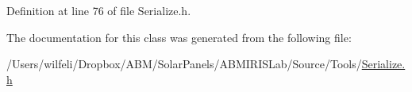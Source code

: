 Definition at line 76 of file Serialize.\+h.



The documentation for this class was generated from the following file\+:\begin{DoxyCompactItemize}
\item 
/\+Users/wilfeli/\+Dropbox/\+A\+B\+M/\+Solar\+Panels/\+A\+B\+M\+I\+R\+I\+S\+Lab/\+Source/\+Tools/\hyperlink{_serialize_8h}{Serialize.\+h}\end{DoxyCompactItemize}
